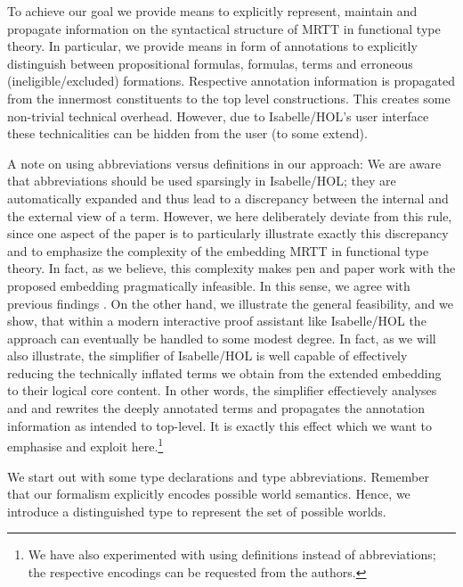 \begin{isabellebody}
\begin{isamarkuptext}
  To achieve our goal we provide means to explicitly represent, maintain and propagate information  on the 
  syntactical structure of MRTT in functional type theory. In particular, we provide means in form of annotations 
  to explicitly distinguish 
  between propositional formulas, formulas, terms and erroneous (ineligible/excluded) formations. 
  Respective annotation information is propagated from the innermost constituents to the top level constructions.
  This creates some non-trivial technical overhead. However, due to Isabelle/HOL's user 
  interface these technicalities can be hidden from the user (to some extend).

  A note on using abbreviations versus definitions in our approach:  We are aware that abbreviations should
  be used sparsingly in Isabelle/HOL; they are automatically expanded and thus lead to a discrepancy 
  between the internal and the external view of a term. However, we here deliberately deviate from this
  rule, since one aspect of the paper is to particularly illustrate exactly this discrepancy and to emphasize the complexity
  of the embedding MRTT in functional type theory. In fact, as we believe, this complexity makes pen and paper 
  work with the proposed embedding pragmatically infeasible. In this sense, we agree with previous 
  findings \cite{zalta11:_relat_versus_funct_found_logic}. On the other hand, we illustrate the general feasibility, and we
  show, that within a modern interactive proof assistant like Isabelle/HOL the approach can eventually be handled to 
  some modest degree. In fact, as we will also
  illustrate, the simplifier  of Isabelle/HOL is well capable of effectively reducing
  the technically inflated terms we obtain from the extended embedding to their logical core content. 
  In other words, the simplifier effectievely analyses and and rewrites the 
  deeply annotated terms and propagates the annotation information as intended to top-level.
  It is exactly this effect which we want to emphasise and exploit here.\footnote{We have also 
  experimented with using definitions instead of abbreviations; the respective 
  encodings can be requested from the authors.}%
\end{isamarkuptext}%
\isamarkuptrue%
%
\isamarkuptrue%
%
\begin{isamarkuptext}%
We start out with some type declarations and type abbreviations. 
  Remember that our formalism explicitly encodes possible world semantics. Hence, we introduce a 
  distinguished type  to represent the set of possible worlds. 

\end{isamarkuptext}
\end{isabellebody}
